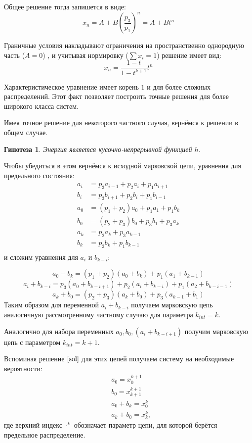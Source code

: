 Общее решение тогда запишется в виде:
   \[ x_n = A + B\left(\frac{p_3}{p_1} \right)^n=A+B t^n\]

Граничные условия накладывают ограничения на пространственно однородную часть ($A=0$) , и учитывая нормировку ($\sum x_i=1$) решение имеет вид:
\begin{equation}
\label{sol}
x_n = \frac{1-t}{1-t^{k+1}} t^n
\end{equation}
\begin{zam}
	Характеристическое уравнение имеет корень $1$ и для более сложных распределений. Этот факт позволяет построить точные решения для более широкого класса систем.
\end{zam}

Имея точное решение для некоторого частного случая, вернёмся к решении в общем случае.
\newtheorem*{hyp}{Гипотеза}
\begin{hyp}
	Энергия является кусочно-непрерывной функцией $h$.
\end{hyp}

Чтобы убедиться в этом вернёмся к исходной марковской цепи, уравнения для предельного состояния:
\begin{align*}
a_i &= p_3 a_{i-1} + p_2 a_i + p_1 a_{i+1}\\
b_i &= p_3 b_{i+1} + p_2 b_i + p_1 b_{i-1}\\
a_0 &= (p_1 + p_2) a_0 + p_1 a_1 + p_1 b_k\\
b_0 &= (p_2 + p_3) b_0 + p_3 b_1 + p_3 a_k \\
a_k &= p_2 a_k + p_3 a_{k-1}\\
b_k &= p_2 b_k + p_1 b_{k-1}\\
\end{align*}
и сложим уравнения для $a_i$ и $b_{k-i}$:
\vspace{1cm}

		\[
a_0+b_{k} = (p_1 + p_2) (a_0 +b_k)  + p_1 (a_1 + b_{k-1})
\]
\[
a_i + b _{k-i} = p_3 (a_0 + b_{k-i+1}) + p_2 (a_i + b_{k-i}) + p_1 (a_2 + b_{k-i-1})
\]
\[
a_k + b_0 = (p_2 + p_3) (a_k + b_0) +p_3(a_{k-1}+b_1)
\]
Таким образом для переменной $a_i + b_{k-i}$ получаем марковскую цепь аналогичную рассмотренному частному случаю для параметра $k_{int}= k$.

Аналогично для набора переменных $a_0, b_0, (a_i + b_{k-i+1})$ получим марковскую цепь с параметром $k_{int} = k+1$.

Вспоминая решение $\ref{sol}$ для этих цепей получаем систему на необходимые вероятности:
	\begin{align*}
	&a_0 = x^{k+1}_0\\
	&b_0 = x^{k+1}_{k+1}\\
	&a_0 + b_{k}= x^{k}_0\\
	&a_k + b_0 = x^k_k,
	\end{align*}
где верхний индекс $\cdot^k$ обозначает параметр цепи, для которой берётся предельное распределение.

